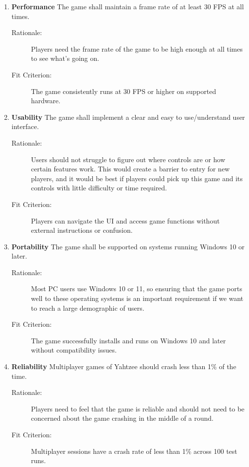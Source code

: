 \begin{enumerate}[label=NFR\arabic*, start=1, left=0pt]

    \item \label{NFR1} \textbf{Performance} The game shall maintain a frame rate of at least 30 FPS at all times.
    \begin{description}
        \item[Rationale:] Players need the frame rate of the game to be high enough at all times to see what’s going on.
        \item[Fit Criterion:] The game consistently runs at 30 FPS or higher on supported hardware.
    \end{description}

    \item \label{NFR2} \textbf{Usability} The game shall implement a clear and easy to use/understand user interface.
    \begin{description}
        \item[Rationale:] Users should not struggle to figure out where controls are or how certain features work. This would create a barrier to entry for new players, and it would be best if players could pick up this game and its controls with little difficulty or time required.
        \item[Fit Criterion:] Players can navigate the UI and access game functions without external instructions or confusion.
    \end{description}

    \item \label{NFR3} \textbf{Portability} The game shall be supported on systems running Windows 10 or later.
    \begin{description}
        \item[Rationale:] Most PC users use Windows 10 or 11, so ensuring that the game ports well to these operating systems is an important requirement if we want to reach a large demographic of users.
        \item[Fit Criterion:] The game successfully installs and runs on Windows 10 and later without compatibility issues.
    \end{description}

    \item \label{NFR4} \textbf{Reliability} Multiplayer games of Yahtzee should crash less than 1\% of the time.
    \begin{description}
        \item[Rationale:] Players need to feel that the game is reliable and should not need to be concerned about the game crashing in the middle of a round.
        \item[Fit Criterion:] Multiplayer sessions have a crash rate of less than 1\% across 100 test runs.
    \end{description}


\end{enumerate}
